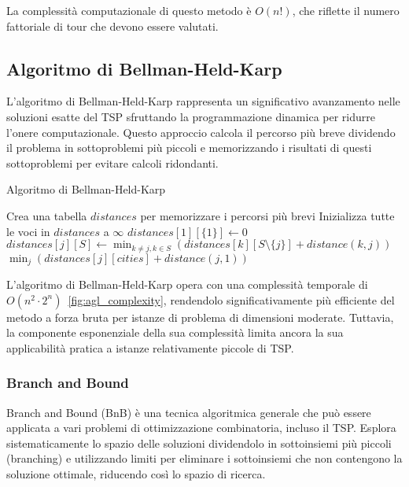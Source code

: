 La complessità computazionale di questo metodo è $O(n!)$, che riflette il numero fattoriale di tour che devono essere valutati.

\subsection{Algoritmo di Bellman-Held-Karp}

L'algoritmo di Bellman-Held-Karp rappresenta un significativo avanzamento nelle soluzioni esatte del \gls{TSP} sfruttando la programmazione dinamica per ridurre l'onere computazionale. Questo approccio calcola il percorso più breve dividendo il problema in sottoproblemi più piccoli e memorizzando i risultati di questi sottoproblemi per evitare calcoli ridondanti.

\begin{algorithm}
	\caption{Algoritmo di Bellman-Held-Karp}\label{bellmanheldkarp}
	\begin{algorithmic}[1]
		\State Crea una tabella $distances$ per memorizzare i percorsi più brevi
		\State Inizializza tutte le voci in $distances$ a $\infty$
		\State $distances[1][\{1\}] \gets 0$ 
		\State $distances[j][S] \gets \min_{k \neq j, k \in S} (distances[k][S\setminus\{j\}] + distance(k, j))$
		\EndFor
		\EndFor
		\EndFor
		\State \Return $\min_{j}(distances[j][cities] + distance(j, 1))$
		\EndProcedure
	\end{algorithmic}
\end{algorithm}

L'algoritmo di Bellman-Held-Karp opera con una complessità temporale di $O(n^2 \cdot 2^n)$~\ref{fig:agl_complexity}, rendendolo significativamente più efficiente del metodo a forza bruta per istanze di problema di dimensioni moderate. Tuttavia, la componente esponenziale della sua complessità limita ancora la sua applicabilità pratica a istanze relativamente piccole di \gls{TSP}.

\subsubsection{Branch and Bound}

Branch and Bound (\gls{BnB}) è una tecnica algoritmica generale che può essere applicata a vari problemi di ottimizzazione combinatoria, incluso il \gls{TSP}. Esplora sistematicamente lo spazio delle soluzioni dividendolo in sottoinsiemi più piccoli (branching) e utilizzando limiti per eliminare i sottoinsiemi che non contengono la soluzione ottimale, riducendo così lo spazio di ricerca.

